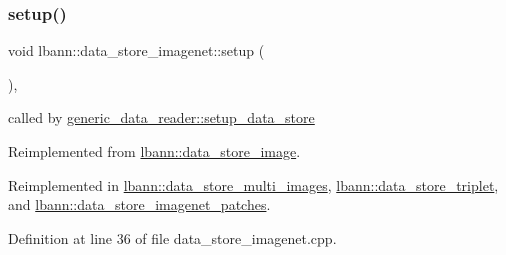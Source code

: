 \subsubsection{\texorpdfstring{setup()}{setup()}}
{\footnotesize\ttfamily void lbann\+::data\+\_\+store\+\_\+imagenet\+::setup (\begin{DoxyParamCaption}{ }\end{DoxyParamCaption})\hspace{0.3cm}{\ttfamily [override]}, {\ttfamily [virtual]}}



called by \hyperlink{classlbann_1_1generic__data__reader_a8b2a09d38512fc11f1b9d572c89100a7}{generic\+\_\+data\+\_\+reader\+::setup\+\_\+data\+\_\+store} 



Reimplemented from \hyperlink{classlbann_1_1data__store__image_a79280b3aa9a207dfacad2bcc9824ec73}{lbann\+::data\+\_\+store\+\_\+image}.



Reimplemented in \hyperlink{classlbann_1_1data__store__multi__images_a7b5e9ec7b7132872299a204d5d24ee62}{lbann\+::data\+\_\+store\+\_\+multi\+\_\+images}, \hyperlink{classlbann_1_1data__store__triplet_aca66b9cf71d7ba2b9870e76c5b92b5e8}{lbann\+::data\+\_\+store\+\_\+triplet}, and \hyperlink{classlbann_1_1data__store__imagenet__patches_aa8cfaf12c87f3dbbbb4fc808f6ca26ad}{lbann\+::data\+\_\+store\+\_\+imagenet\+\_\+patches}.



Definition at line 36 of file data\+\_\+store\+\_\+imagenet.\+cpp.


